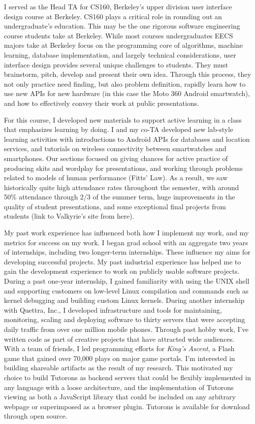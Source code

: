 \documentclass[12pt]{memoir}
\begin{document}
I served as the Head TA for CS160, Berkeley's upper division user interface design course at Berkeley.
CS160 plays a critical role in rounding out an undergraduate's education.
This may be the one rigorous software engineering course students take at Berkeley.
While most courses undergraduates EECS majors take at Berkeley focus on the programming core of algorithms, machine learning, database implementation, and largely technical considerations, user interface design provides several unique challenges to students.
They must brainstorm, pitch, develop and present their own idea.
Through this process, they not only practice need finding, but also problem definition, rapidly learn how to use new APIs for new hardware (in this case the Moto 360 Android smartwatch), and how to effectively convey their work at public presentations.

For this course, I developed new materials to support active learning in a class that emphasizes learning by doing.
I and my co-TA developed new lab-style learning activities with introductions to Android APIs for databases and location services, and tutorials on wireless connectivity between smartwatches and smartphones.
Our sections focused on giving chances for active practice of producing skits and wordplay for presentations, and working through problems related to models of human performance (Fitts' Law).
As a result, we saw historically quite high attendance rates throughout the semester, with around 50\% attendance through 2/3 of the summer term, huge improvements in the quality of student presentations, and some exceptional final projects from students (link to Valkyrie's site from here).

My past work experience has influenced both how I implement my work, and my metrics for success on my work.
I began grad school with an aggregate two years of internships, including two longer-term internships. 
These influence my aims for developing successful projects.
My past industrial experience has helped me to gain the development experience to work on publicly usable software projects.
During a past one-year internship, I gained familiarity with using the UNIX shell and supporting customers on low-level Linux compilation and commands such as kernel debugging and building custom Linux kernels.
During another internship with Quettra, Inc., I developed infrastructure and tools for maintaining, monitoring, scaling and deploying software to thirty servers that were accepting daily traffic from over one million mobile phones.
Through past hobby work, I've written code as part of creative projects that have attracted wide audiences.
With a team of friends, I led programming efforts for \emph{King's Ascent}, a Flash game that gained over 70,000 plays on major game portals.
I'm interested in building shareable artifacts as the result of my research.
This motivated my choice to build Tutorons as backend servers that could be flexibly implemented in any language with a loose architecture, and the implementation of Tutorons viewing as both a JavaScript library that could be included on any arbitrary webpage or superimposed as a browser plugin.
Tutorons is available for download through open source.
\end{document}
